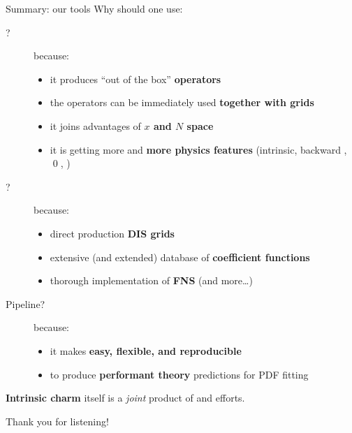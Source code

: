 \documentclass[9pt]{beamer}
\begin{document}
\begin{frame}{Summary: our tools}
    Why should one use:
    \begin{description}
        \item[\eko?] because:
            \begin{itemize}
                \item it produces \enquote{out of the box} \textbf{operators}
                \item the operators can be immediately used \textbf{together with grids}
                \item it joins advantages of \textbf{$x$ and $N$ space}
                \item it is getting more and \textbf{more physics
                    features} (intrinsic, backward \vfns, \qed, \nnnlo)
            \end{itemize}
        \item[\yadism?] because:
            \begin{itemize}
                \item direct production \textbf{DIS grids}
                \item extensive (and extended) database of \textbf{coefficient
                    functions}
                \item thorough implementation of \textbf{FNS} (and more\dots)
            \end{itemize}
        \item[Pipeline?] because:
            \begin{itemize}
                \item it makes \textbf{easy, flexible, and reproducible}
                \item to produce \textbf{performant theory} predictions for PDF fitting
            \end{itemize}
                 \end{description}

    \vspace*{15pt}
    \alert{\textbf{Intrinsic charm}} itself is a \textit{joint} product of \eko
    and \textbf{} efforts.
\end{frame}

\begin{frame}[standout]
    Thank you for listening!
\end{frame}

\appendix

\section{\eko}
\end{document}
